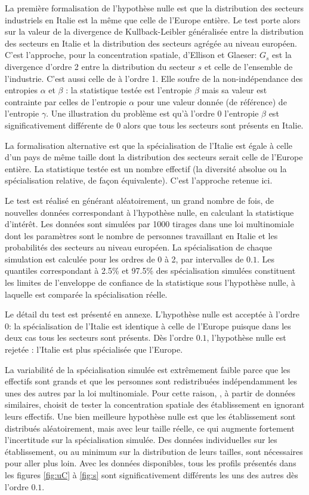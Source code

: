 \documentclass[fleqn,10pt]{ArtEcoFoG} %
\begin{document}
La première formalisation de l'hypothèse nulle est que la distribution
des secteurs industriels en Italie est la même que celle de l'Europe
entière. Le test porte alors sur la valeur de la divergence de
Kullback-Leibler généralisée entre la distribution des secteurs en
Italie et la distribution des secteurs agrégée au niveau européen. C'est
l'approche, pour la concentration spatiale, d'Ellison et Glaeser:
\(G_s\) est la divergence d'ordre 2 entre la distribution du secteur
\(s\) et celle de l'ensemble de l'industrie. C'est aussi celle de
\citet{Mori2005} à l'ordre 1. Elle soufre de la non-indépendance des
entropies \(\alpha\) et \(\beta\) \citep{Jost2007}: la statistique
testée est l'entropie \(\beta\) mais sa valeur est contrainte par celles
de l'entropie \(\alpha\) pour une valeur donnée (de référence) de
l'entropie \(\gamma\). Une illustration du problème est qu'à l'ordre 0
l'entropie \(\beta\) est significativement différente de 0 alors que
tous les secteurs sont présents en Italie.

La formalisation alternative est que la spécialisation de l'Italie est
égale à celle d'un pays de même taille dont la distribution des secteurs
serait celle de l'Europe entière. La statistique testée est un nombre
effectif (la diversité absolue ou la spécialisation relative, de façon
équivalente). C'est l'approche retenue ici.

Le test est réalisé en générant aléatoirement, un grand nombre de fois,
de nouvelles données correspondant à l'hypothèse nulle, en calculant la
statistique d'intérêt. Les données sont simulées par 1000 tirages dans
une loi multinomiale dont les paramètres sont le nombre de personnes
travaillant en Italie et les probabilités des secteurs au niveau
européen. La spécialisation de chaque simulation est calculée pour les
ordres de 0 à 2, par intervalles de \(0.1\). Les quantiles correspondant
à 2.5\% et 97.5\% des spécialisation simulées constituent les limites de
l'enveloppe de confiance de la statistique sous l'hypothèse nulle, à
laquelle est comparée la spécialisation réelle.

Le détail du test est présenté en annexe. L'hypothèse nulle est acceptée
à l'ordre 0: la spécialisation de l'Italie est identique à celle de
l'Europe puisque dans les deux cas tous les secteurs sont présents. Dès
l'ordre \(0.1\), l'hypothèse nulle est rejetée : l'Italie est plus
spécialisée que l'Europe.

La variabilité de la spécialisation simulée est extrêmement faible parce
que les effectifs sont grands et que les personnes sont redistribuées
indépendamment les unes des autres par la loi multinomiale. Pour cette
raison, \citet{Mori2005}, à partir de données similaires, choisit de
tester la concentration spatiale des établissement en ignorant leurs
effectifs. Une bien meilleure hypothèse nulle est que les établissement
sont distribués aléatoirement, mais avec leur taille réelle, ce qui
augmente fortement l'incertitude sur la spécialisation simulée. Des
données individuelles sur les établissement, ou au minimum sur la
distribution de leurs tailles, sont nécessaires pour aller plus loin.
Avec les données disponibles, tous les profils présentés dans les
figures \ref{fig:uC} à \ref{fig:s} sont significativement différents les
uns des autres dès l'ordre \(0.1\).
\end{document}
